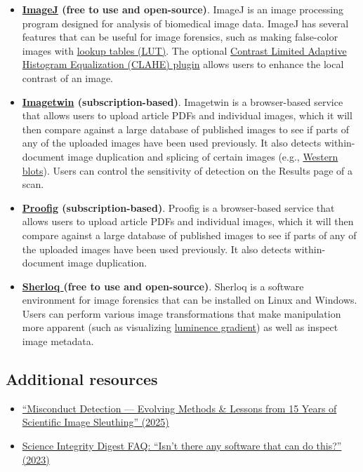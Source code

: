 \documentclass[letterpaper, 12pt]{article}
\begin{document}
\begin{itemize}
    \item \textbf{\href{https://imagej.net/ij/}{ImageJ} (free to use and open-source)}. ImageJ is an image processing program designed for analysis of biomedical image data. ImageJ has several features that can be useful for image forensics, such as making false-color images with \href{https://imagej.net/ij/docs/concepts.html}{lookup tables (LUT)}. The optional \href{https://imagej.net/ij/plugins/clahe/index.html}{Contrast Limited Adaptive Histogram Equalization (CLAHE) plugin} allows users to enhance the local contrast of an image.
    \item \textbf{\href{https://imagetwin.ai/}{Imagetwin} (subscription-based)}. Imagetwin is a browser-based service that allows users to upload article PDFs and individual images, which it will then compare against a large database of published images to see if parts of any of the uploaded images have been used previously. It also detects within-document image duplication and splicing of certain images (e.g., \href{https://en.wikipedia.org/wiki/Western_blot}{Western blots}). Users can control the sensitivity of detection on the Results page of a scan.
    \item \textbf{\href{https://www.proofig.com/}{Proofig} (subscription-based)}. Proofig is a browser-based service that allows users to upload article PDFs and individual images, which it will then compare against a large database of published images to see if parts of any of the uploaded images have been used previously. It also detects within-document image duplication.
    \item \textbf{\href{https://github.com/GuidoBartoli/sherloq}{Sherloq } (free to use and open-source)}. Sherloq is a software environment for image forensics that can be installed on Linux and Windows. Users can perform various image transformations that make manipulation more apparent (such as visualizing \href{https://en.wikipedia.org/wiki/Image_gradient}{luminence gradient}) as well as inspect image metadata.
\end{itemize}

\subsection*{Additional resources}

\begin{itemize}
    \setlength\itemsep{-0.5em}
    \item \href{https://doi.org/10.1017/jme.2025.32}{``Misconduct Detection — Evolving Methods \& Lessons from 15 Years of Scientific Image Sleuthing'' (2025)}
    \item \href{https://scienceintegritydigest.com/frequently-asked-questions/}{Science Integrity Digest FAQ: ``Isn't there any software that can do this?'' (2023)}
\end{itemize}
\end{document}
